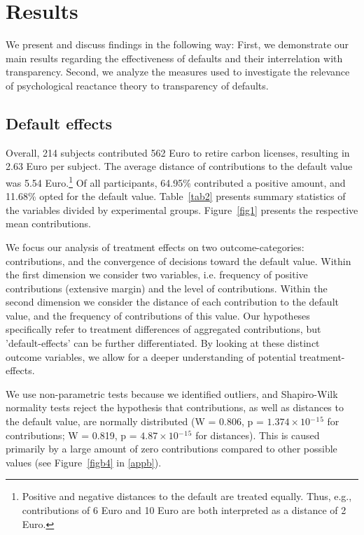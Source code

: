 \documentclass[review, authoryear,12pt]{elsarticle}
\begin{document}
\section{Results}
We present and discuss findings in the following way: First, we demonstrate our main results regarding the effectiveness of defaults and their interrelation with transparency. Second, we analyze the measures used to investigate the relevance of psychological reactance theory to transparency of defaults.

\subsection{Default effects}
Overall, 214 subjects contributed 562 Euro to retire carbon licenses, resulting in 2.63 Euro per subject. The average distance of contributions to the default value was 5.54 Euro.\footnote{Positive and negative distances to the default are treated equally. Thus, e.g., contributions of 6 Euro  and 10 Euro  are both interpreted as a distance of 2 Euro.} Of all participants, 64.95\% contributed a positive amount, and 11.68\% opted for the default value. Table~\ref{tab2} presents summary statistics of the variables divided by experimental groups. Figure~\ref{fig1} presents the respective mean contributions.

We focus our analysis of treatment effects on two outcome-categories: contributions, and the convergence of decisions toward the default value. Within the first dimension we consider two variables, i.e. frequency of positive contributions (extensive margin) and the level of contributions. Within the second dimension we consider the distance of each contribution to the default value, and the frequency of contributions of this value. Our hypotheses specifically refer to treatment differences of aggregated contributions, but 'default-effects' can be further differentiated. By looking at these distinct outcome variables, we allow for a deeper understanding of potential treatment-effects.

We use non-parametric tests because we identified outliers, and Shapiro-Wilk normality tests reject the hypothesis that contributions, as well as distances to the default value, are normally distributed (W = 0.806, p = $1.374\times 10$$^-$$^1$$^5$ for contributions; W = 0.819, p = $4.87\times 10$$^-$$^1$$^5$ for distances). This is caused primarily by a large amount of zero contributions compared to other possible values (see Figure~\ref{figb4} in \ref{appb}).
\end{document}
